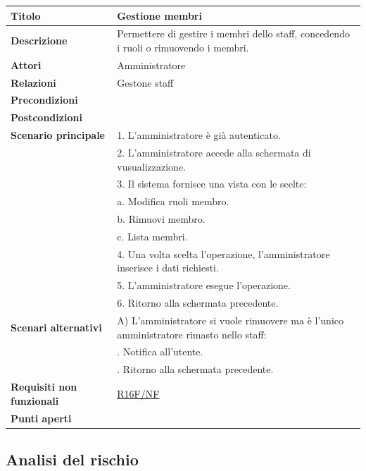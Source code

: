 \documentclass[a4paper]{article}
\begin{document}
\begin{center}
\begin{tabularx}{1\textwidth}{|l|X|}
    \hline
	\textbf{Titolo} & Gestione membri \\
	\hline
	\textbf{Descrizione} & Permettere di gestire i membri dello staff, concedendo i ruoli o rimuovendo i membri. \\
	\hline
	\textbf{Attori} & Amministratore \\
	\hline
	\textbf{Relazioni} & Gestone staff \\
	\hline
	\textbf{Precondizioni} &  \\
	\hline
	\textbf{Postcondizioni} &  \\
	\hline
	\textbf{Scenario principale} & 1. L'amministratore è già autenticato.\\
	                             & 2. L'amministratore accede alla schermata di vusualizzazione. \\
								 & 3. Il sistema fornisce una vista con le scelte: \\
								 & \quad a. Modifica ruoli membro.\\
								 & \quad b. Rimuovi membro.\\
								 & \quad c. Lista membri.\\
								 & 4. Una volta scelta l'operazione, l'amministratore inserisce i dati richiesti. \\
								 & 5. L'amministratore esegue l'operazione.\\
								 & 6. Ritorno alla schermata precedente.\\
	\hline
	\textbf{Scenari alternativi} & A) L'amministratore si vuole rimuovere ma è l'unico amministratore rimasto nello staff: \\
								 & \quad 1. Notifica all'utente. \\
								 & \quad 2. Ritorno alla schermata precedente. \\
	\hline
	\textbf{Requisiti non funzionali} & \hyperlink{R16F/NF}{R16F/NF} \\
	\hline
	\textbf{Punti aperti} & \\
	\hline
\end{tabularx}
\end{center}


\newpage

\subsection{Analisi del rischio}
\end{document}
